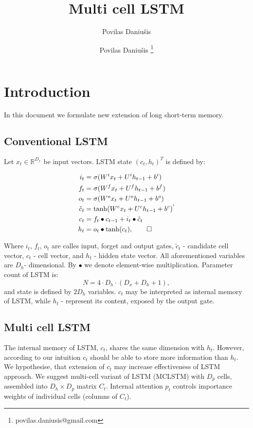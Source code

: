 \documentclass[a4paper,11pt]{article}
\author{Povilas Daniu\v{s}is}
\author[1]{Povilas Daniu\v{s}is \thanks{povilas.daniusis@gmail.com}}
\title{Multi cell LSTM}
\begin{document}
\maketitle
\section{Introduction}

In this document we formulate new extension of long short-term memory. 

\subsection{Conventional LSTM}
Let $x_{t} \in \mathbb{R}^{D_{x}}$ be input vectors. LSTM state $(c_{t}, h_{t})^{T}$ is defined by:

\begin{align}
\begin{split}
\label{LSTM}
i_{t} &=\sigma(W^{i}x_{t} + U^{i}h_{t-1} + b^{i})\\
f_{t} &=\sigma(W^{f}x_{t} + U^{f}h_{t-1} + b^{f})\\
o_{t} &=\sigma(W^{o}x_{t} + U^{o}h_{t-1} + b^{o})\\
\tilde{c}_{t} &= \tanh(W^{c}x_{t} + U^{c}h_{t-1} + b^{c})\\
c_{t} &=f_{t} \bullet c_{t-1} + i_{t} \bullet \tilde{c}_{t}\\
h_{t} &=o_{t} \bullet \tanh(c_{t}), \qedhere
\end{split},
\end{align}

Where $i_{t}$, $f_{t}$, $o_{t}$ are calles input, forget and output gates, $\tilde{c}_{t}$ - candidate cell vector, $c_{t}$ - cell vector, and $h_{t}$ - hidden state vector. All aforementioned variables are $D_{h}$- dimensional. By $\bullet$ we denote element-wise multiplication. Parameter count of LSTM is:
\begin{equation}
\label{eq:lstm_parameter_count}
N =  4 \cdot D_{h} \cdot (D_{x}  + D_{h} + 1),
\end{equation}
and state is defined by $2 D_{h}$ variables.
$c_{t}$ may be interpreted as internal memory of LSTM, while $h_{t}$ - represent its content, exposed by the output gate.  

\subsection{Multi cell LSTM} 
The internal memory of LSTM, $c_{t}$, shares the same dimension with $h_{t}$. However, according to our intuition $c_{t}$ should be able to store more information than $h_{t}$. We hypothesise, that extension of $c_{t}$ may increase effectiveness of LSTM approach. We suggest multi-cell variant of LSTM (MCLSTM) with $D_{p}$ cells, assembled into $D_{h} 
\times D_{p}$ matrix $C_{t}$. Internal attention $p_{t}$ controls importance weights of individual cells (columns of $C_{t}$).
\end{document}
